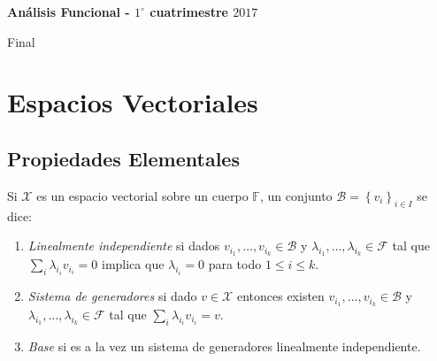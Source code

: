 \documentclass[11pt]{article}
\newcommand{\B}{\mathcal{B}}
\newcommand{\F}{\mathcal{F}}
\newcommand{\sett}[1]{\left\lbrace#1\right\rbrace}
\newcommand{\Bigsum}[2]{\sum\limits_{#1}{#2}}
\newenvironment{definition}[1][Definici\'on]{\begin{trivlist}
		\item[\hskip \labelsep {\bfseries #1}]}{\end{trivlist}}
\begin{document}
	
	\pagestyle{empty}
	\pagestyle{fancy}
	\fancyfoot[CO]{\slshape \thepage}
	\renewcommand{\headrulewidth}{0pt}
	
	
	
	\centerline{\bf An\'alisis Funcional - $1^{\circ}$ cuatrimestre $2017$}
	\centerline{\sc Final}
	
	\bigskip

\section{Espacios Vectoriales}

\subsection{Propiedades Elementales}

\begin{definition}
Si $\mathcal{X}$ es un espacio vectorial sobre un cuerpo $\mathbb{F}$, un conjunto $\mathcal{B} = \sett{v_i}_{i \in I}$ se dice:

\begin{enumerate}
\item \textit{Linealmente independiente} si dados $v_{i_1}, \dots, v_{i_k} \in \B$ y $\lambda_{i_1},  \dots, \lambda_{i_k} \in \F$ tal que $\Bigsum{i}{\lambda_{i_i}v_{i_i}} = 0$ implica que $\lambda_{i_i} = 0$ para todo $1 \leq i \leq k$.
\item \textit{Sistema de generadores} si dado $v \in \mathcal{X}$ entonces existen $v_{i_1}, \dots, v_{i_k} \in \B$ y $\lambda_{i_1},  \dots, \lambda_{i_k} \in \F$ tal que $\Bigsum{i}{\lambda_{i_i}v_{i_i}} = v$.
\item \textit{Base} si es a la vez un sistema de generadores linealmente independiente.
\end{enumerate}
\end{definition}
\end{document}
